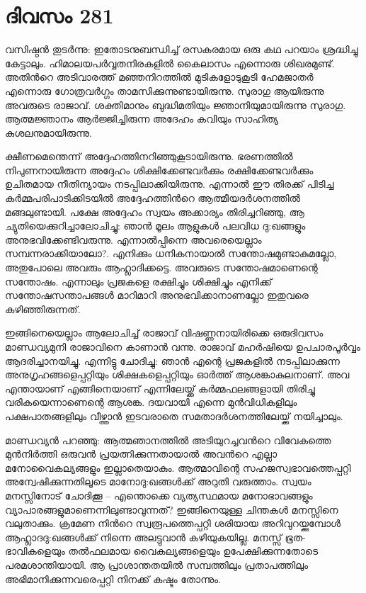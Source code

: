 \section{ദിവസം 281}


വസിഷ്ഠന്‍ തുടര്‍ന്നു: ഇതോടനുബന്ധിച്ച് രസകരമായ ഒരു കഥ പറയാം ശ്രദ്ധിച്ചു കേട്ടാലും. ഹിമാലയപര്‍വ്വതനിരകളില്‍ കൈലാസം എന്നൊരു ശിഖരമുണ്ട്. അതിന്‍റെ അടിവാരത്ത് മഞ്ഞനിറത്തില്‍ മുടികളോടുകൂടി ഹേമജാതര്‍ എന്നൊരു ഗോത്രവര്‍ഗ്ഗം താമസിക്കുന്നുണ്ടായിരുന്നു. സുരാഗു ആയിരുന്നു അവരുടെ രാജാവ്. ശക്തിമാനും ബുദ്ധിമതിയും ജ്ഞാനിയുമായിരുന്നു സുരാഗു. ആത്മജ്ഞാനം ആര്‍ജ്ജിച്ചിരുന്ന അദേഹം കവിയും സാഹിത്യ കുശലനുമായിരുന്നു.

ക്ഷീണമെന്തെന്ന് അദ്ദേഹത്തിനറിഞ്ഞുകൂടായിരുന്നു. ഭരണത്തില്‍ നിപുണനായിരുന്ന അദ്ദേഹം ശിക്ഷിക്കേണ്ടവര്‍ക്കും രക്ഷിക്കേണ്ടവര്‍ക്കും ഉചിതമായ നീതിന്യായം നടപ്പിലാക്കിയിരുന്നു. എന്നാല്‍ ഈ തിരക്ക് പിടിച്ച കര്‍മ്മപരിപാടിക്കിടയില്‍ അദ്ദേഹത്തിന്‍റെ ആത്മീയദര്‍ശനത്തില്‍ മങ്ങലുണ്ടായി. പക്ഷേ അദ്ദേഹം സ്വയം അക്കാര്യം തിരിച്ചറിഞ്ഞു, ആ ച്യുതിയെക്കുറിച്ചാലോചിച്ചു: ഞാന്‍ മൂലം ആളുകള്‍ പലവിധ ദു:ഖങ്ങളും അനുഭവിക്കേണ്ടിവരുന്നു. എന്നാല്‍പ്പിന്നെ അവരെയെല്ലാം സമ്പന്നരാക്കിയാലോ?. എനിക്കും ധനികനായാല്‍ സന്തോഷമുണ്ടാകുമല്ലോ, അതുപോലെ  അവരും ആഹ്ലാദിക്കട്ടെ. അവരുടെ സന്തോഷമാണെന്റെ സന്തോഷം. എന്നാലും പ്രജകളെ രക്ഷിച്ചും ശിക്ഷിച്ചും എനിക്ക് സന്തോഷസന്താപങ്ങള്‍ മാറിമാറി അനുഭവിക്കാനാണല്ലോ ഇതുവരെ കഴിഞ്ഞിരുന്നത്.  

ഇങ്ങിനെയെല്ലാം ആലോചിച്ച് രാജാവ് വിഷണ്ണനായിരിക്കെ ഒരുദിവസം മാണ്ഡവ്യമുനി രാജാവിനെ കാണാന്‍ വന്നു. രാജാവ് മഹര്‍ഷിയെ ഉപചാരപൂര്‍വ്വം ആദരിച്ചാനയിച്ചു. എന്നിട്ടു ചോദിച്ചു: ഞാന്‍ എന്റെ പ്രജകളില്‍ നടപ്പിലാക്കുന്ന അനുഗൃഹങ്ങളെപ്പറ്റിയും ശിക്ഷകളെപ്പറ്റിയും ഓര്‍ത്ത്‌ ആശങ്കാകുലനാണ്. അവ എന്തായാണ് എങ്ങിനെയാണ് എന്നിലേയ്ക്ക് കര്‍മ്മഫലങ്ങളായി തിരിച്ചു വരികയെന്നാണെന്റെ ആശങ്ക. ദയവായി എന്നെ മുന്‍വിധികളിലും പക്ഷപാതങ്ങളിലും വീഴ്ത്താന്‍ ഇടവരാതെ സമതാദര്‍ശനത്തിലേയ്ക്ക് നയിച്ചാലും.       

മാണ്ഡവ്യന്‍ പറഞ്ഞു: ആത്മഞാനത്തില്‍ അടിയുറച്ചവന്‍റെ വിവേകത്തെ മുന്‍നിര്‍ത്തി ഒരുവന്‍ പ്രയത്നിക്കുന്നതായാല്‍ അവന്‍റെ എല്ലാ മനോവൈകല്യങ്ങളും ഇല്ലാതെയാകും. ആത്മാവിന്റെ സഹജസ്വഭാവത്തെപ്പറ്റി അന്വേഷിക്കുന്നതിലൂടെ മാനോദു:ഖങ്ങള്‍ക്ക് അറുതി വരുത്താം. സ്വയം മനസ്സിനോട് ചോദിക്കൂ – എന്തൊക്കെ വ്യത്യസ്ഥമായ മനോഭാവങ്ങളും വ്യാപാരങ്ങളുമാണെന്നിലുണ്ടാവുന്നത്? ഇങ്ങിനെയുള്ള ചിന്തകള്‍ മനസ്സിനെ വലുതാക്കും. ക്രമേണ നിന്‍റെ സ്വരൂപത്തെപ്പറ്റി ശരിയായ അറിവുറയ്ക്കുമ്പോള്‍ ആഹ്ലാദദു:ഖങ്ങള്‍ക്ക് നിന്നെ അലട്ടുവാന്‍ കഴിയുകയില്ല. മനസ്സ് ഭൂത-ഭാവികളെയും തല്‍ഫലമായ വൈകല്യങ്ങളെയും ഉപേക്ഷിക്കുന്നതോടെ പരമശാന്തിയായി. ആ പ്രാശാന്തതയില്‍ സമ്പത്തിലും പ്രതാപത്തിലും അഭിമാനിക്കുന്നവരെപ്പറ്റി നിനക്ക് കഷ്ടം തോന്നും.   

